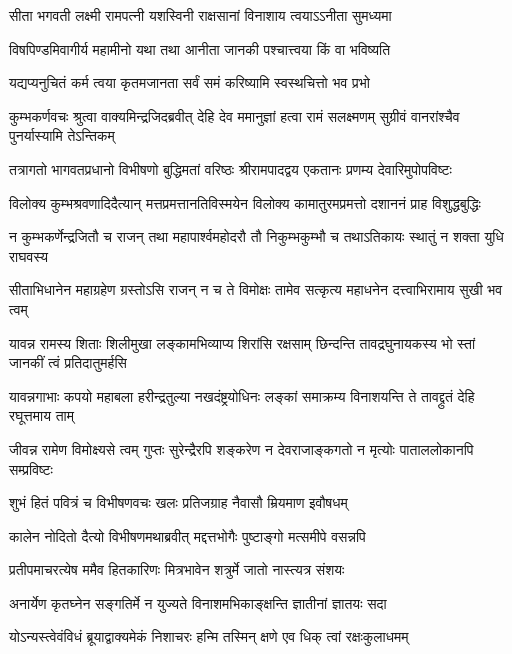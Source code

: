 \twolineshloka
{सीता भगवती लक्ष्मी रामपत्नी यशस्विनी}
{राक्षसानां विनाशाय त्वयाऽऽनीता सुमध्यमा} %

\twolineshloka
{विषपिण्डमिवागीर्य महामीनो यथा तथा}
{आनीता जानकी पश्चात्त्वया किं वा भविष्यति} %

\twolineshloka
{यद्यप्यनुचितं कर्म त्वया कृतमजानता}
{सर्वं समं करिष्यामि स्वस्थचित्तो भव प्रभो} %

\threelineshloka
{कुम्भकर्णवचः श्रुत्वा वाक्यमिन्द्रजिदब्रवीत्}
{देहि देव ममानुज्ञां हत्वा रामं सलक्ष्मणम्}
{सुग्रीवं वानरांश्चैव पुनर्यास्यामि तेऽन्तिकम्} %

\fourlineindentedshloka
{तत्रागतो भागवतप्रधानो}
{विभीषणो बुद्धिमतां वरिष्ठः}
{श्रीरामपादद्वय एकतानः}
{प्रणम्य देवारिमुपोपविष्टः} %

\fourlineindentedshloka
{विलोक्य कुम्भश्रवणादिदैत्यान्}
{मत्तप्रमत्तानतिविस्मयेन}
{विलोक्य कामातुरमप्रमत्तो}
{दशाननं प्राह विशुद्धबुद्धिः} %

\fourlineindentedshloka
{न कुम्भकर्णेन्द्रजितौ च राजन्}
{तथा महापार्श्वमहोदरौ तौ}
{निकुम्भकुम्भौ च तथाऽतिकायः}
{स्थातुं न शक्ता युधि राघवस्य} %

\fourlineindentedshloka
{सीताभिधानेन महाग्रहेण}
{ग्रस्तोऽसि राजन् न च ते विमोक्षः}
{तामेव सत्कृत्य महाधनेन}
{दत्त्वाभिरामाय सुखी भव त्वम्} %

\fourlineindentedshloka
{यावन्न रामस्य शिताः शिलीमुखा}
{लङ्कामभिव्याप्य शिरांसि रक्षसाम्}
{छिन्दन्ति तावद्रघुनायकस्य भो\-}
{स्तां जानकीं त्वं प्रतिदातुमर्हसि} %

\fourlineindentedshloka
{यावन्नगाभाः कपयो महाबला}
{हरीन्द्रतुल्या नखदंष्ट्रयोधिनः}
{लङ्कां समाक्रम्य विनाशयन्ति ते}
{तावद्द्रुतं देहि रघूत्तमाय ताम्} %

\fourlineindentedshloka
{जीवन्न रामेण विमोक्ष्यसे त्वम्}
{गुप्तः सुरेन्द्रैरपि शङ्करेण}
{न देवराजाङ्कगतो न मृत्योः}
{पाताललोकानपि सम्प्रविष्टः} %

\twolineshloka
{शुभं हितं पवित्रं च विभीषणवचः खलः}
{प्रतिजग्राह नैवासौ म्रियमाण इवौषधम्} %

\twolineshloka
{कालेन नोदितो दैत्यो विभीषणमथाब्रवीत्}
{मद्दत्तभोगैः पुष्टाङ्गो मत्समीपे वसन्नपि} %

\twolineshloka
{प्रतीपमाचरत्येष ममैव हितकारिणः}
{मित्रभावेन शत्रुर्मे जातो नास्त्यत्र संशयः} %

\twolineshloka
{अनार्येण कृतघ्नेन सङ्गतिर्मे न युज्यते}
{विनाशमभिकाङ्क्षन्ति ज्ञातीनां ज्ञातयः सदा} %

\twolineshloka
{योऽन्यस्त्वेवंविधं ब्रूयाद्वाक्यमेकं निशाचरः}
{हन्मि तस्मिन् क्षणे एव धिक् त्वां रक्षःकुलाधमम्} %

